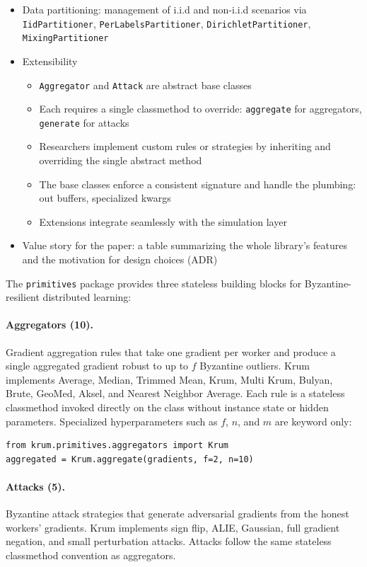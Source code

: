 \documentclass[twoside,11pt]{article}
\begin{document}
{\begin{itemize}
\begin{itemize}
\begin{itemize}
        \end{itemize}
    \end{itemize}
    \item Data partitioning: management of i.i.d and non-i.i.d scenarios via \texttt{IidPartitioner}, \texttt{PerLabelsPartitioner}, \texttt{DirichletPartitioner}, \texttt{MixingPartitioner}
    \item Extensibility
    \begin{itemize}
        \item \texttt{Aggregator} and \texttt{Attack} are abstract base classes
        \item Each requires a single classmethod to override: \texttt{aggregate} for aggregators, \texttt{generate} for attacks
        \item Researchers implement custom rules or strategies by inheriting and overriding the single abstract method
        \item The base classes enforce a consistent signature and handle the plumbing: out buffers, specialized kwargs
        \item Extensions integrate seamlessly with the simulation layer
    \end{itemize}
    \item Value story for the paper: a table summarizing the whole library's features and the motivation for design choices (ADR)
\end{itemize}
}

The \texttt{primitives} package provides three stateless building blocks for Byzantine-resilient distributed learning:

\paragraph{Aggregators (10).}
Gradient aggregation rules that take one gradient per worker and produce a single aggregated gradient robust to up to $f$ Byzantine outliers. Krum implements Average, Median, Trimmed Mean, Krum, Multi Krum, Bulyan, Brute, GeoMed, Aksel, and Nearest Neighbor Average. Each rule is a stateless classmethod invoked directly on the class without instance state or hidden parameters. Specialized hyperparameters such as $f$, $n$, and $m$ are keyword only:
\begin{verbatim}
from krum.primitives.aggregators import Krum
aggregated = Krum.aggregate(gradients, f=2, n=10)
\end{verbatim}

\paragraph{Attacks (5).}
Byzantine attack strategies that generate adversarial gradients from the honest workers' gradients. Krum implements sign flip, ALIE, Gaussian, full gradient negation, and small perturbation attacks. Attacks follow the same stateless classmethod convention as aggregators.
\end{document}
